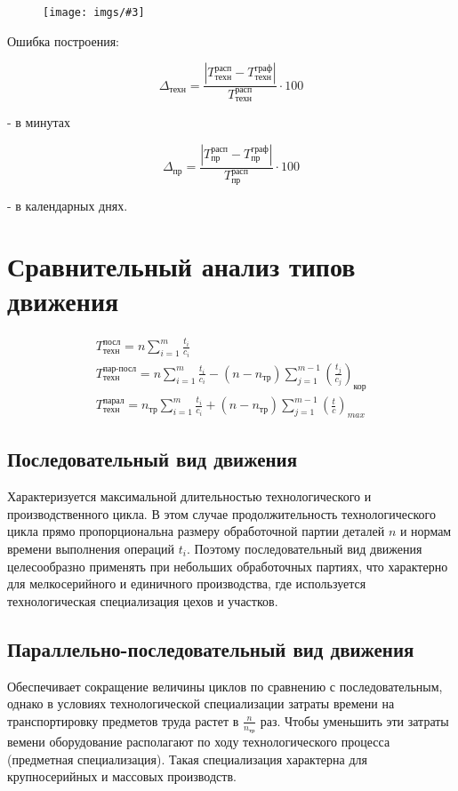 \documentclass[14pt,a4paper,oneside]{extarticle}
\newcommand{\pic}[3]{
	\begin{figure}[#1]
		\begin{center}
			\texttt{[image: imgs/\#3]}
		\end{center}
	\end{figure}
}
\begin{document}
\pic{H}{\textwidth}{8}

Ошибка построения:

\[\Delta_\text{техн}=\frac{\left\lvert T_\text{техн}^\text{расп}-T_\text{техн}^\text{граф}\right\rvert }{T_\text{техн}^\text{расп}}\cdot 100\]

- в минутах

\[\Delta_\text{пр}=\frac{\left\lvert T_\text{пр}^\text{расп}-T_\text{пр}^\text{граф}\right\rvert }{T_\text{пр}^\text{расп}}\cdot 100\]

- в календарных днях.

\section{Сравнительный анализ типов движения}

\begin{gather*}
    T_\text{техн}^\text{посл}=n\sum_{i=1}^{m}\frac{t_i}{c_i}\\
    T_\text{техн}^\text{пар-посл}=n\sum_{i=1}^m\frac{t_i}{c_i}-(n-n_\text{тр})\sum_{j=1}^{m-1}\left(\frac{t_j}{c_j}\right)_\text{кор}\\
    T_\text{техн}^\text{парал}=n_\text{тр}\sum_{i=1}^m\frac{t_i}{c_i}+(n-n_\text{тр})\sum_{j=1}^{m-1}\left(\frac{t}{c}\right)_{max}
\end{gather*}

\subsection{Последовательный вид движения} Характеризуется максимальной длительностью технологического и производственного цикла. В этом случае продолжительность технологического цикла прямо пропорциональна размеру обработочной партии деталей $n$ и нормам времени выполнения операций $t_i$. Поэтому последовательный вид движения целесообразно применять при небольших обработочных партиях, что характерно для мелкосерийного и единичного производства, где используется технологическая специализация цехов и участков.

\subsection{Параллельно-последовательный вид движения} Обеспечивает сокращение величины циклов по сравнению с последовательным, однако в условиях технологической специализации затраты времени на транспортировку предметов труда растет в $\frac{n}{n_\text{тр}}$ раз. Чтобы уменьшить эти затраты вемени оборудование располагают по ходу технологического процесса (предметная специализация). Такая специализация характерна для крупносерийных и массовых производств.
\end{document}
